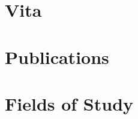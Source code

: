 \documentclass[../main.tex]{subfiles}
\begin{document}
	\section*{\centering Vita}
	\section*{\centering Publications}
	\section*{\centering Fields of Study}
	\clearpage
\end{document}
